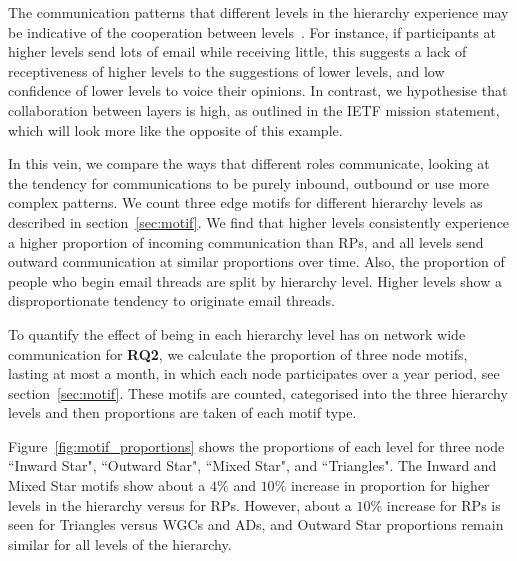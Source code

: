 \documentclass[twocolumn,10pt]{article}
\begin{document}


The communication patterns that different levels in the hierarchy
experience may be  indicative of the cooperation between
levels~\cite{li2021does,duan2018authoritarian}. For instance, if
participants at higher levels send lots of email while receiving little,
this suggests a lack of receptiveness of higher levels to the suggestions
of lower levels, and low confidence of lower levels to voice their
opinions. In contrast, we hypothesise that collaboration between layers is
high, as outlined in the IETF mission statement, which will look more like
the opposite of this example.

In this vein, we compare the ways that different roles communicate, looking
at the tendency for communications to be purely inbound, outbound or use
more complex patterns. We count three edge motifs for different hierarchy
levels as described in section~\ref{sec:motif}. We find that higher levels
consistently experience a higher proportion of incoming communication than
RPs, and all levels send outward communication at similar proportions over
time. Also, the proportion of people who begin email threads are split by
hierarchy level. Higher levels show a disproportionate tendency to
originate email threads. 


To quantify the effect of being in each hierarchy level has on network wide
communication for \textbf{RQ2}, we calculate the proportion of three node
motifs, lasting at most a month, in which each node participates over a
year period, see section~\ref{sec:motif}. These motifs are counted,
categorised into the three hierarchy levels and then proportions are taken
of each motif type. 

Figure~\ref{fig:motif_proportions} shows the proportions of each level for
three node ``Inward Star", ``Outward Star", ``Mixed Star", and
``Triangles". The Inward and Mixed Star motifs show about a $4\%$ and
$10\%$ increase in proportion for higher levels in the hierarchy versus for
RPs. However, about a $10\%$ increase for RPs is seen for Triangles versus
WGCs and ADs, and Outward Star proportions remain similar for all levels of
the hierarchy.
\end{document}
